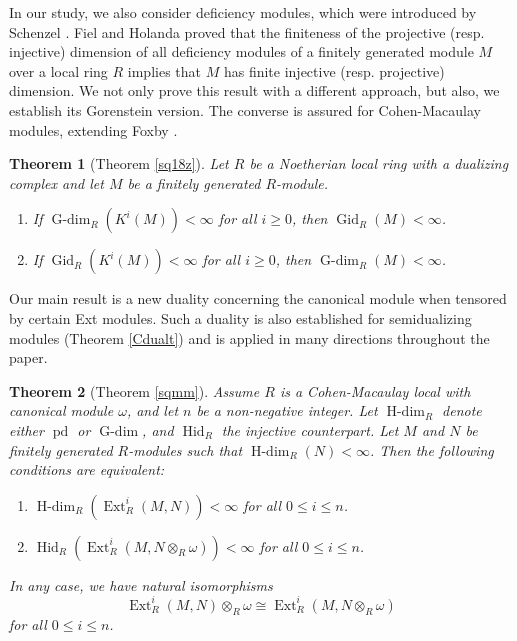 \documentclass[11pt, a4paper,pagebackref]{amsart}
\numberwithin{equation}{section}
\newtheorem{theorem}{Theorem}[section]
\theoremstyle{definition}
\newtheorem{remark and definition}[theorem]{Remark and Definition}
\newtheorem{remark and notation}[theorem]{Remark and Notation}
\newcommand\Ext{\operatorname{Ext}}
\begin{document}
In our study, we also consider deficiency modules, which were introduced by Schenzel \cite{Sch98}. Fiel and Holanda \cite{FH} proved that the finiteness of the projective (resp. injective) dimension of all deficiency modules of a finitely generated module $M$ over a local ring $R$ implies that $M$ has finite injective (resp. projective) dimension.  We not only prove this result with a different approach, but also, we establish its Gorenstein version. The converse is assured for Cohen-Macaulay modules, extending Foxby \cite{onthemuiinaminimalinjectiveresolution}.

\begin{theorem}[{\rm Theorem \ref{sq18z}}]\label{defmod}
    Let $R$ be a Noetherian local ring with a dualizing complex and let $M$ be a finitely generated $R$-module.
    \begin{enumerate}[\rm (1)]
        \item If $\operatorname{G-dim}_R(K^i(M))<\infty$ for all $i\geq 0$, then $\operatorname{Gid}_R(M)<\infty$.
        \item If $\operatorname{Gid}_R(K^i(M))<\infty$ for all $i\geq 0$, then $\operatorname{G-dim}_R(M)<\infty$.
    \end{enumerate}
\end{theorem}


Our main result is a new duality concerning the canonical module when tensored by certain Ext modules. Such a duality is also established for semidualizing modules (Theorem \ref{Cdualt}) and is applied in many directions throughout the paper.





\begin{theorem}[{\rm Theorem \ref{sqmm}}]\label{sqmm1}
    Assume $R$ is a Cohen-Macaulay local with canonical module $\omega$, and let $n$ be a non-negative integer. Let $\operatorname{H-dim}_R$ denote either 
    $\operatorname{pd}$ or $\operatorname{G-dim}$,  and $\operatorname{Hid}_R$ the injective counterpart. Let $M$ and $N$ be finitely generated $R$-modules such that $\operatorname{H-dim}_R(N)<\infty$.  Then the following conditions are equivalent:
    \begin{enumerate}[\rm(1)]
        \item $\operatorname{H-dim}_R(\Ext_R^i(M,N))<\infty$ for all $0\leq i \leq n$.
        \item $\operatorname{Hid}_R(\Ext_R^i(M, N \otimes_R \omega))<\infty$ for all $0\leq i \leq n$.
    \end{enumerate}
   In any case, we have natural isomorphisms $$\Ext_R^i(M,N) \otimes_R \omega \cong \Ext_R^i(M, N \otimes_R \omega)$$
    for all $0\leq i \leq n$. 
\end{theorem}
\end{document}
